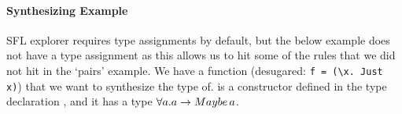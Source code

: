 \paragraph{Synthesizing Example}
\label{c2:types_demo_2}
\ac{SFL} explorer requires type assignments by default, but the below example does not have a type assignment as this allows us to hit some of the rules that we did not hit in the `pairs' example. We have a function  (desugared: \lstinline[language=SFL]|f = (\x. Just x)|) that we want to synthesize the type of.  is a constructor defined in the type declaration , and it has a type $\forall a. a \rightarrow Maybe\,a$.

\begin{figure}[t]
\end{figure}
